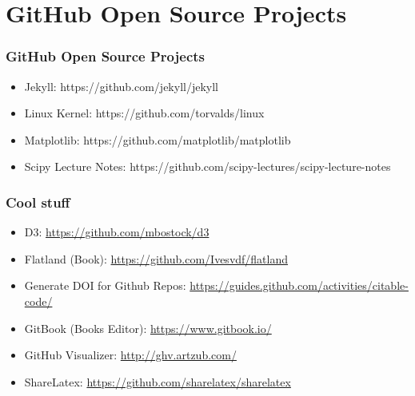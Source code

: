 \section[Open Source]{GitHub Open Source Projects}
\begin{frame}
    \frametitle{GitHub Open Source Projects}
    
\begin{itemize}    
	\item Jekyll: https://github.com/jekyll/jekyll \pause
        
    \item Linux Kernel: https://github.com/torvalds/linux \pause
    
    \item Matplotlib: https://github.com/matplotlib/matplotlib\pause
        
    \item Scipy Lecture Notes: https://github.com/scipy-lectures/scipy-lecture-notes
    
\end{itemize}   

\end{frame}
\note{}

\begin{frame}
    \frametitle{Cool stuff}
    
    \begin{itemize}
    \item D3: \url{https://github.com/mbostock/d3} \pause
    
    \item Flatland (Book): \url{https://github.com/Ivesvdf/flatland} \pause
    
    \item Generate DOI for Github Repos: \url{https://guides.github.com/activities/citable-code/} \pause 

    \item GitBook (Books Editor): \url{https://www.gitbook.io/} \pause
     
    \item GitHub Visualizer: \url{http://ghv.artzub.com/} \pause
       
    \item ShareLatex: \url{https://github.com/sharelatex/sharelatex}
    \end{itemize}
\end{frame}
\note{}

